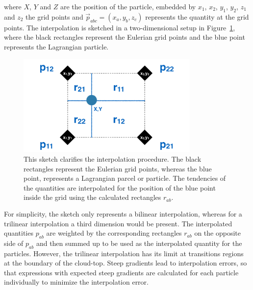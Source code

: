 \documentclass[12pt]{article}
\begin{document}
where $X$, $Y$ and $Z$ are the position of the particle, embedded by $x_{1}$, $x_{2}$, $y_{1}$, $y_{2}$, $z_{1}$ and $z_{2}$ the grid points and $\vec{p}_{abc}=(x_a, y_b, z_c)$ represents the quantity at the grid points. The interpolation is sketched in a two-dimensional setup in Figure~\ref{fig:interpolation_sketch}, where the black rectangles represent the Eulerian grid points and the blue point represents the Lagrangian particle.
\begin{figure}[htbp]
	\centering
		\includegraphics[width=0.8\textwidth,height=0.8\textheight,keepaspectratio]{figs/interpolation_sketch.pdf}
	\caption[Interpolation sketch]{This sketch clarifies the interpolation procedure. The black rectangles represent the Eulerian grid points, whereas the blue point, represents a Lagrangian parcel or particle. The tendencies of the quantities are interpolated for the position of the blue point inside the grid using the calculated rectangles $r_{ab}$.}
	\label{fig:interpolation_sketch}
\end{figure}
For simplicity, the sketch only represents a bilinear interpolation, whereas for a trilinear interpolation a third dimension would be present. The interpolated quantities $p_{ab}$ are weighted by the corresponding rectangles $r_{ab}$ on the opposite side of $p_{ab}$ and then summed up to be used as the interpolated quantity for the particles. \newline
However, the trilinear interpolation has its limit at transitions regions at the boundary of the cloud-top. Steep gradients lead to interpolation errors, so that expressions with expected steep gradients are calculated for each particle individually to minimize the interpolation error. 
\end{document}
